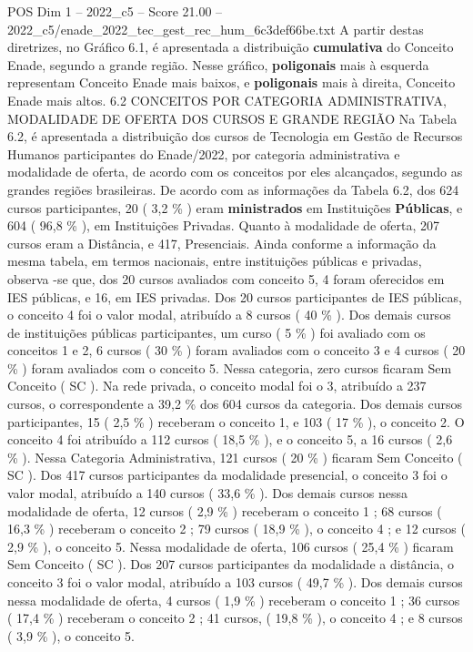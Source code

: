 \begin{textsample}{POS Dim 1 – 2022\_c5 – Score 21.00 – 2022\_c5/enade\_2022\_tec\_gest\_rec\_hum\_6c3def66be.txt}
A partir destas diretrizes, no Gráfico 6.1, é apresentada a distribuição \textbf{cumulativa} do Conceito Enade, segundo a grande região.
Nesse gráfico, \textbf{poligonais} mais à esquerda representam Conceito Enade mais baixos, e \textbf{poligonais} mais à direita, Conceito Enade mais altos. 6.2 CONCEITOS POR CATEGORIA ADMINISTRATIVA, MODALIDADE DE OFERTA DOS CURSOS E GRANDE REGIÃO Na Tabela 6.2, é apresentada a distribuição dos cursos de Tecnologia em Gestão de Recursos Humanos participantes do Enade/2022, por categoria administrativa e modalidade de oferta, de acordo com os conceitos por eles alcançados, segundo as grandes regiões brasileiras.
De acordo com as informações da Tabela 6.2, dos 624 cursos participantes, 20 ( 3,2 \% ) eram \textbf{ministrados} em Instituições \textbf{Públicas}, e 604 ( 96,8 \% ), em Instituições Privadas.
Quanto à modalidade de oferta, 207 cursos eram a Distância, e 417, Presenciais.
Ainda conforme a informação da mesma tabela, em termos nacionais, entre instituições públicas e privadas, observa -se que, dos 20 cursos avaliados com conceito 5, 4 foram oferecidos em IES públicas, e 16, em IES privadas.
Dos 20 cursos participantes de IES públicas, o conceito 4 foi o valor modal, atribuído a 8 cursos ( 40 \% ).
Dos demais cursos de instituições públicas participantes, um curso ( 5 \% ) foi avaliado com os conceitos 1 e 2, 6 cursos ( 30 \% ) foram avaliados com o conceito 3 e 4 cursos ( 20 \% ) foram avaliados com o conceito 5.
Nessa categoria, zero cursos ficaram Sem Conceito ( SC ).
Na rede privada, o conceito modal foi o 3, atribuído a 237 cursos, o correspondente a 39,2 \% dos 604 cursos da categoria.
Dos demais cursos participantes, 15 ( 2,5 \% ) receberam o conceito 1, e 103 ( 17 \% ), o conceito 2.
O conceito 4 foi atribuído a 112 cursos ( 18,5 \% ), e o conceito 5, a 16 cursos ( 2,6 \% ).
Nessa Categoria Administrativa, 121 cursos ( 20 \% ) ficaram Sem Conceito ( SC ).
Dos 417 cursos participantes da modalidade presencial, o conceito 3 foi o valor modal, atribuído a 140 cursos ( 33,6 \% ).
Dos demais cursos nessa modalidade de oferta, 12 cursos ( 2,9 \% ) receberam o conceito 1 ; 68 cursos ( 16,3 \% ) receberam o conceito 2 ; 79 cursos ( 18,9 \% ), o conceito 4 ; e 12 cursos ( 2,9 \% ), o conceito 5.
Nessa modalidade de oferta, 106 cursos ( 25,4 \% ) ficaram Sem Conceito ( SC ).
Dos 207 cursos participantes da modalidade a distância, o conceito 3 foi o valor modal, atribuído a 103 cursos ( 49,7 \% ).
Dos demais cursos nessa modalidade de oferta, 4 cursos ( 1,9 \% ) receberam o conceito 1 ; 36 cursos ( 17,4 \% ) receberam o conceito 2 ; 41 cursos, ( 19,8 \% ), o conceito 4 ; e 8 cursos ( 3,9 \% ), o conceito 5.

\end{textsample}

